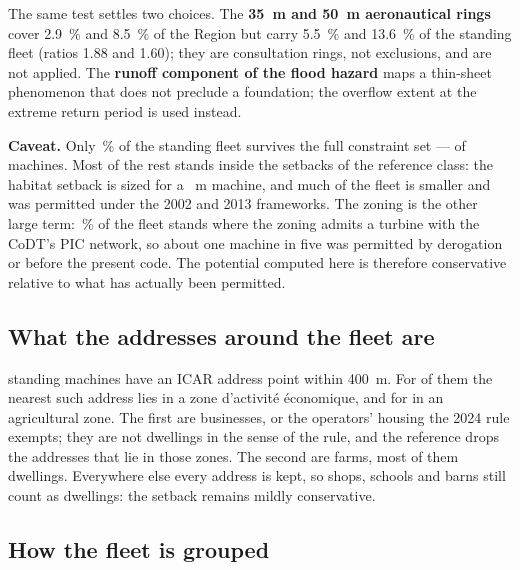 \documentclass[11pt,a4paper]{article}
\newcommand{\caveat}[1]{\par\medskip\noindent\colorbox{warn!8}{%
  \begin{minipage}{\dimexpr\linewidth-2\fboxsep}\textbf{Caveat.} #1\end{minipage}}\par\medskip}
\begin{document}
The same test settles two choices. The \textbf{35~m and 50~m aeronautical
rings} cover \SI{2.9}{\percent} and \SI{8.5}{\percent} of the Region but carry
\SI{5.5}{\percent} and \SI{13.6}{\percent} of the standing fleet (ratios
\num{1.88} and \num{1.60}); they are consultation rings, not exclusions, and
are not applied. The \textbf{runoff component of the flood hazard} maps a
thin-sheet phenomenon that does not preclude a foundation; the overflow extent
at the extreme return period is used instead.

\caveat{Only \FleetRefPct{}\,\% of the standing fleet survives the full
constraint set --- \FleetRefN{} of \FleetN{} machines. Most of the rest stands
inside the setbacks of the reference class: the habitat setback is sized for a
\TipHeight{}~m machine, and much of the fleet is smaller and was permitted under
the 2002 and 2013 frameworks. The zoning is the other large term:
\FleetZoningCodt{}\,\% of the fleet stands where the zoning admits a turbine
with the CoDT's PIC network, so about one machine in five was permitted by
derogation or before the present code. The potential computed here is
therefore conservative relative to what has actually been permitted.}

\subsection{What the addresses around the fleet are}

\FleetAddrN{} standing machines have an ICAR address point within
\SI{400}{\metre}. For \FleetAddrZae{} of them the nearest such address lies in
a zone d'activité économique, and for \FleetAddrAgri{} in an agricultural zone.
The first are businesses, or the operators' housing the 2024 rule exempts; they
are not dwellings in the sense of the rule, and the reference drops the
\AddrExempt{} addresses that lie in those zones. The second are farms, most of
them dwellings. Everywhere else every address is kept, so shops, schools and
barns still count as dwellings: the setback remains mildly conservative.

\subsection{How the fleet is grouped}\label{sec:fleetgeometry}
\end{document}
